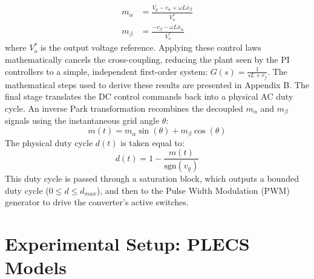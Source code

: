 \documentclass[DIV=calc, paper=a4, fontsize=11pt, twocolumn]{scrartcl}	 %
\begin{document}
\begin{subequations}\begin{align}
    m_\alpha &= \frac{V_g - v_\alpha + \omega L \bar{x}_\beta}{V_o^*}  \label{eq:decouple_alpha} \\
    m_\beta &= \frac{- v_\beta - \omega L \bar{x}_\alpha}{V_o^*} \label{eq:decouple_beta}
\end{align}\end{subequations}
where $V_o^*$ is the output voltage reference. Applying these control laws mathematically cancels the cross-coupling, reducing the plant seen by the PI controllers to a simple, independent first-order system: $G(s) = \frac{1}{sL + r_f}$. The mathematical steps used to derive these results are presented in Appendix B.
The final stage translates the DC control commands back into a physical AC duty cycle. An inverse Park transformation recombines the decoupled $m_\alpha$ and $m_\beta$ signals using the instantaneous grid angle $\theta$:
\begin{equation}\label{eq:inv_park}
    m(t) = m_\alpha \sin(\theta) + m_\beta \cos(\theta)
\end{equation}
The physical duty cycle $d(t)$ is taken equal to:
\begin{equation}\label{eq:duty}
    d(t) = 1 - \frac{m(t)}{\text{sgn}(v_g)}
\end{equation}
This duty cycle is passed through a saturation block, which outputs a bounded duty cycle ($0 \le d \le d_{max}$), and then to the Pulse Width Modulation (PWM) generator to drive the converter's active switches.


\section{Experimental Setup: PLECS Models}
\end{document}
